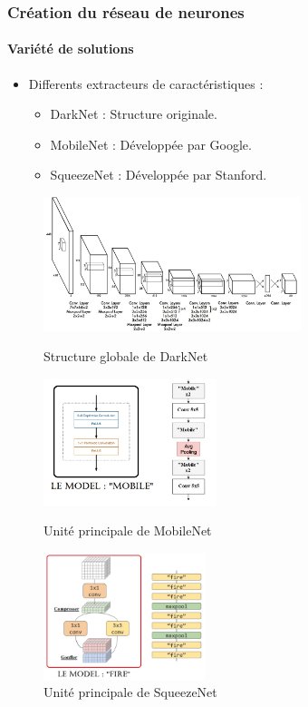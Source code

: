 
\begin{frame}
\frametitle{Création du réseau de neurones}
\framesubtitle{Variété de solutions}

\begin{itemize}
    \item<1->   Differents extracteurs de caractéristiques :
    \begin{itemize}
        \item<1->   DarkNet : Structure originale.
        \item<2->   MobileNet : Développée par Google.
        \item<3->   SqueezeNet : Développée par Stanford.
    \end{itemize}
\end{itemize}
\begin{figure}
    \begin{overprint}
        \centering\includegraphics[width=0.67\textwidth]{figures/Darknet.PNG}\caption{Structure globale de DarkNet}
        \centering\includegraphics[width=0.45\textwidth]{figures/MobNet.PNG}\caption{Unité principale de MobileNet}
        \centering\includegraphics[width=0.42\textwidth]{figures/SqzNet.PNG}\caption{Unité principale de SqueezeNet}
    \end{overprint}
\end{figure}
\end{frame}

